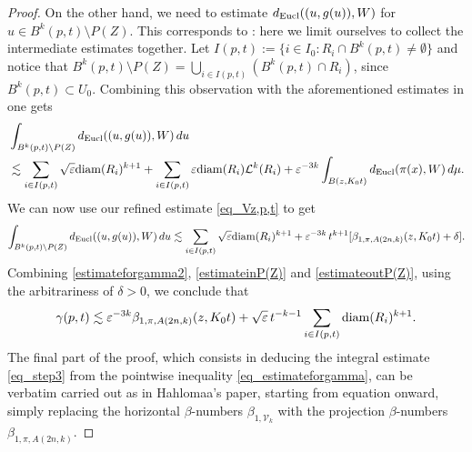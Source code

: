 \documentclass[12pt]{amsart}
\newcommand{\R}{\mathbb R}
\newcommand{\diam}{{\rm diam}}
\newcommand{\N}{\mathbb N}
\numberwithin{equation}{section}
\theoremstyle{plain}
\theoremstyle{definition}
\theoremstyle{remark}
\begin{document}
\begin{proof}
On the other hand, we need to estimate $d_{\rm Eucl}((u,g(u)),W)$ for $u\in B^k(p,t)\setminus P(Z)$. This corresponds to \cite[Lemma 6.3, inequality (34), Lemma 6.4 and Lemma 6.5]{Hahlomaa}: here we limit ourselves to collect the intermediate estimates together. Let $I(p,t):=\{i\in I_0:R_i\cap B^k(p,t)\neq \emptyset\}$ and notice that $B^k(p,t)\setminus P(Z)=\bigcup_{i\in I(p,t)}(B^k(p,t)\cap R_i)$, %
since $B^k(p,t)\subset U_0$. Combining this observation with the aforementioned estimates in \cite{Hahlomaa} one gets
\[\begin{split}&\int_{B^k(p,t)\setminus P(Z)}d_{\rm Eucl}((u,g(u)),W)\,du
%
\\&\lesssim \sum_{i\in I(p,t)} \sqrt\varepsilon \diam(R_i)^{k+1}+\sum_{i\in I(p,t)}\varepsilon \diam(R_i)\mathcal  L^k(R_i)+\varepsilon^{-3k}\int_{B(z,K_0 t)}d_{\rm Eucl}(\pi(x),W)\,d\mu.\end{split}\]
We can now use our refined estimate \eqref{eq_Vz,p,t} to get
\begin{equation}\label{estimateoutP(Z)}
    \int_{B^k(p,t)\setminus P(Z)}d_{\rm Eucl}((u,g(u)),W)\,du\lesssim \sum_{i\in I(p,t)}\sqrt\varepsilon \diam(R_i)^{k+1}+\varepsilon^{-3k}\,t^{k+1}[\beta_{1,\pi,A(2n,k)}(z, K_0t)+\delta].
\end{equation}
Combining \eqref{estimateforgamma2}, \eqref{estimateinP(Z)} and \eqref{estimateoutP(Z)}, using the arbitrariness of $\delta>0$, we conclude that
\begin{equation}
   \label{eq_estimateforgamma} 
\gamma(p,t)\lesssim \varepsilon^{-3k}\beta_{1,\pi,A(2n,k)}(z, K_0t)+\sqrt\varepsilon\, t^{-k-1}\sum_{i\in I(p,t)} \diam(R_i)^{k+1} .\end{equation}
The final part of the proof, which consists in deducing the integral estimate \eqref{eq_step3} from the pointwise inequality \eqref{eq_estimateforgamma}, can be verbatim carried out as in Hahlomaa's paper, starting from equation \cite[(38)]{Hahlomaa} onward, simply replacing the horizontal $\beta$-numbers $\beta_{1,\mathcal V_k}$ with the projection $\beta$-numbers $\beta_{1,\pi,A(2n,k)}$.
\end{proof}
\end{document}
